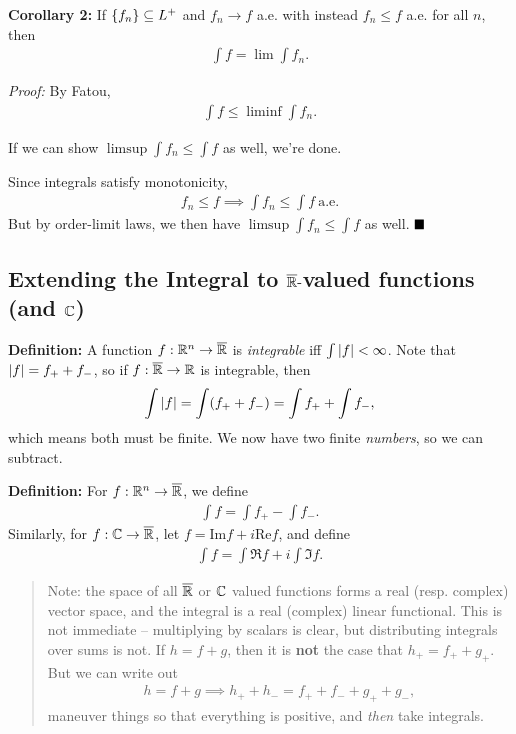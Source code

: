 \textbf{Corollary 2:} If \(\left\{{f_n}\right\} \subseteq L^+\) and
\(f_n \to f\) a.e. with instead \(f_n \leq f\) a.e. for all \(n\), then
\begin{align*}
\int f = \lim \int f_n
.\end{align*}

\emph{Proof:} By Fatou,
\begin{align*}
\int f \leq \liminf \int f_n
.\end{align*}

If we can show \(\limsup \int f_n \leq \int f\) as well, we're done.

Since integrals satisfy monotonicity,
\begin{align*}
f_n \leq f \implies \int f_n \leq \int f ~\text{a.e.}
\end{align*} But by order-limit laws, we then have
\(\limsup \int f_n \leq \int f\) as well. \(\qed\)

\hypertarget{extending-the-integral-to-overline-rrdashvalued-functions-and-cc}{%
\subsection{\texorpdfstring{Extending the Integral to
\(\overline {{\mathbb{R}}}{\hbox{-}}\)valued functions (and
\({\mathbb{C}}\))}{Extending the Integral to \textbackslash overline \textbackslash RR\textbackslash dashvalued functions (and \textbackslash CC)}}\label{extending-the-integral-to-overline-rrdashvalued-functions-and-cc}}

\textbf{Definition:} A function \(f: {\mathbb{R}}^n \to \overline {{\mathbb{R}}}\) is
\emph{integrable} iff \(\int {\left\lvert {f} \right\rvert} < \infty\). Note that
\({\left\lvert {f} \right\rvert} = f_+ + f_-\), so if \(f:\overline {{\mathbb{R}}} \to {\mathbb{R}}\) is integrable,
then
\begin{align*}
\int {\left\lvert {f} \right\rvert} = \int (f_+ + f_-) = \int f_+ + \int f_-,
\end{align*} which means both must be finite. We now have two finite
\emph{numbers}, so we can subtract.

\textbf{Definition:} For \(f:{\mathbb{R}}^n \to \overline {{\mathbb{R}}}\), we define
\begin{align*}
\int f = \int f_+ - \int f_-.
\end{align*} Similarly, for \(f: {\mathbb{C}} \to \overline {{\mathbb{R}}}\), let
\(f = \mathrm{Im} f + i\mathrm{Re} f\), and define
\begin{align*}
\int f = \int \Re f + i\int \Im f.
\end{align*}

\begin{quote}
Note: the space of all \(\overline {{\mathbb{R}}}\) or \({\mathbb{C}}\) valued functions
forms a real (resp. complex) vector space, and the integral is a real
(complex) linear functional. This is not immediate -- multiplying by
scalars is clear, but distributing integrals over sums is not. If
\(h = f + g\), then it is \textbf{not} the case that
\(h_+ = f_+ + g_+\). But we can write out
\begin{align*}
h = f + g \implies h_+ + h_- = f_+ + f_- + g_+ + g_-
,\end{align*} maneuver things so that everything is positive, and
\emph{then} take integrals.
\end{quote}


